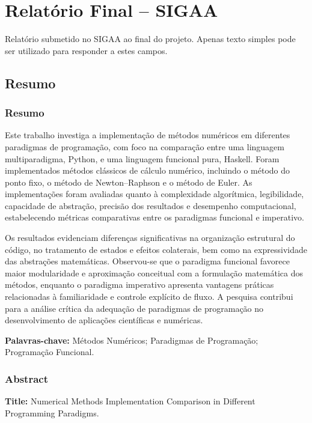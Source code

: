 \section{Relatório Final -- SIGAA}
\label{cap:Relatorio_Final_SIGAA}

Relatório submetido no SIGAA ao final do projeto.
Apenas texto simples pode ser utilizado para responder a estes campos.

\subsection{Resumo}

\subsubsection{Resumo}

Este trabalho investiga a implementação de métodos numéricos em diferentes
paradigmas de programação, com foco na comparação entre uma linguagem
multiparadigma, Python, e uma linguagem funcional pura, Haskell. Foram
implementados métodos clássicos de cálculo numérico, incluindo o método do
ponto fixo, o método de Newton--Raphson e o método de Euler. As implementações
foram avaliadas quanto à complexidade algorítmica, legibilidade, capacidade de
abstração, precisão dos resultados e desempenho computacional, estabelecendo
métricas comparativas entre os paradigmas funcional e imperativo.

Os resultados evidenciam diferenças significativas na organização estrutural
do código, no tratamento de estados e efeitos colaterais, bem como na
expressividade das abstrações matemáticas. Observou-se que o paradigma
funcional favorece maior modularidade e aproximação conceitual com a formulação
matemática dos métodos, enquanto o paradigma imperativo apresenta vantagens
práticas relacionadas à familiaridade e controle explícito de fluxo. A
pesquisa contribui para a análise crítica da adequação de paradigmas de
programação no desenvolvimento de aplicações científicas e numéricas.

\noindent
\textbf{Palavras-chave:} Métodos Numéricos; Paradigmas de Programação;
Programação Funcional.

\subsubsection{Abstract}

\noindent
\textbf{Title:} Numerical Methods Implementation Comparison in Different
Programming Paradigms.

